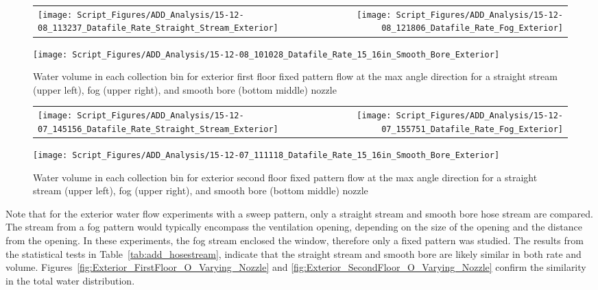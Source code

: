\documentclass{book}
\begin{document}
\begin{figure}[ht]
\begin{tabular*}{\textwidth}{lr}
\texttt{[image: Script\_Figures/ADD\_Analysis/15-12-08\_113237\_Datafile\_Rate\_Straight\_Stream\_Exterior]} &
\texttt{[image: Script\_Figures/ADD\_Analysis/15-12-08\_121806\_Datafile\_Rate\_Fog\_Exterior]} \\
\end{tabular*}
\centering
\texttt{[image: Script\_Figures/ADD\_Analysis/15-12-08\_101028\_Datafile\_Rate\_15\_16in\_Smooth\_Bore\_Exterior]}
\caption{Water volume in each collection bin for exterior first floor fixed pattern flow at the max angle direction for a straight stream (upper left), fog (upper right), and smooth bore (bottom middle) nozzle}
\label{fig:Exterior_FirstFloor_Fixed_Varying_Nozzle}
\end{figure}

\begin{figure}[ht]
\begin{tabular*}{\textwidth}{lr}
\texttt{[image: Script\_Figures/ADD\_Analysis/15-12-07\_145156\_Datafile\_Rate\_Straight\_Stream\_Exterior]} &
\texttt{[image: Script\_Figures/ADD\_Analysis/15-12-07\_155751\_Datafile\_Rate\_Fog\_Exterior]} \\
\end{tabular*}
\centering
\texttt{[image: Script\_Figures/ADD\_Analysis/15-12-07\_111118\_Datafile\_Rate\_15\_16in\_Smooth\_Bore\_Exterior]}
\caption{Water volume in each collection bin for exterior second floor fixed pattern flow at the max angle direction for a straight stream (upper left), fog (upper right), and smooth bore (bottom middle) nozzle}
\label{fig:Exterior_SecondFloor_Fixed_Varying_Nozzle}
\end{figure}

\clearpage

Note that for the exterior water flow experiments with a sweep pattern, only a straight stream and smooth bore hose stream are compared. The stream from a fog pattern would typically encompass the ventilation opening, depending on the size of the opening and the distance from the opening. In these experiments, the fog stream enclosed the window, therefore only a fixed pattern was studied. The results from the statistical tests in Table~\ref{tab:add_hosestream}, indicate that the straight stream and smooth bore are likely similar in both rate and volume. Figures~\ref{fig:Exterior_FirstFloor_O_Varying_Nozzle} and \ref{fig:Exterior_SecondFloor_O_Varying_Nozzle} confirm the similarity in the total water distribution.
\end{document}
